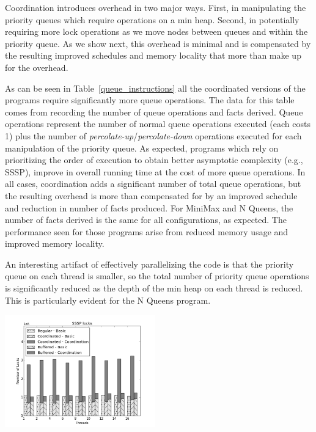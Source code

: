 Coordination introduces overhead in two major ways.  First, in
manipulating the priority queues which require operations on a min
heap.  Second, in potentially requiring more lock operations as we
move nodes between queues and within the priority queue.  As we show
next, this overhead is minimal and is compensated by the resulting improved schedules
and memory locality that more than make up for the overhead.

As can be seen in Table~\ref{queue_instructions} all the coordinated
versions of the programs require significantly more queue operations.
The data for this table comes from recording the number of queue
operations and facts derived.  Queue operations represent the number
of normal queue operations executed (each costs 1) plus the number of
\emph{percolate-up}/\emph{percolate-down} operations executed for each
manipulation of the priority queue.  As expected, programs which rely
on prioritizing the order of execution to obtain better asymptotic
complexity (e.g., SSSP), improve in overall running time at the cost of
more queue operations.  In all cases, coordination adds a significant
number of total queue operations, but the resulting overhead is more
than compensated for by an improved schedule and reduction in number
of facts produced. For MiniMax and N Queens, the number of facts
derived is the same for all configurations, as expected. The
performance seen for those programs arise from reduced memory usage
and improved memory locality.

An interesting artifact of effectively parallelizing the code is that
the priority queue on each thread is smaller, so the total number of
priority queue operations is significantly reduced as the depth of the
min heap on each thread is reduced.  This is particularly evident for
the N Queens program.

\begin{topfig}
   \begin{center}
      \includegraphics[width=6.5cm]{results/locks/sssp-locks.png}
   \end{center}
\end{topfig}

